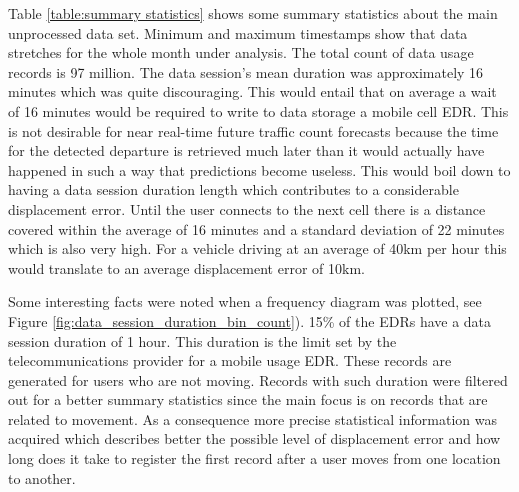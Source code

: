 \documentclass[12pt, a4paper]{report}
\theoremstyle{definition}
\theoremstyle{definition}%
\theoremstyle{definition}%
\theoremstyle{definition}%
\theoremstyle{definition}%
\theoremstyle{definition}%
\begin{document}

Table \ref{table:summary statistics} shows some summary statistics about the main unprocessed data set. Minimum and maximum timestamps show that data stretches for the whole month under analysis. The total count of data usage records is 97 million. The data session's mean duration was approximately 16 minutes which was quite discouraging. This would entail that on average a wait of 16 minutes would be required to write to data storage a mobile cell EDR. This is not desirable for near real-time future traffic count forecasts because the time for the detected departure is retrieved much later than it would actually have happened in such a way that predictions become useless. This would boil down to having a data session duration length which contributes to a considerable displacement error. Until the user connects to the next cell there is a distance covered within the average of 16 minutes and a standard deviation of 22 minutes which is also very high. For a vehicle driving at an average of 40km per hour this would translate to an average displacement error of 10km. 


\begin{table}[h]
	\centering
	\caption{Basic summary statistics of main EDR dataset.} 
	\label{table:summary statistics}
\end{table}


Some interesting facts were noted when a frequency diagram was plotted, see Figure \ref{fig:data_session_duration_bin_count}). 15\% of the EDRs have a data session duration of 1 hour. This duration is the limit set by the telecommunications provider for a mobile usage EDR. These records are generated for users who are not moving. Records with such duration were filtered out for a better summary statistics since the main focus is on records that are related to movement. As a consequence more precise statistical information was acquired which describes better the possible level of displacement error and how long does it take to register the first record after a user moves from one location to another.
\end{document}

